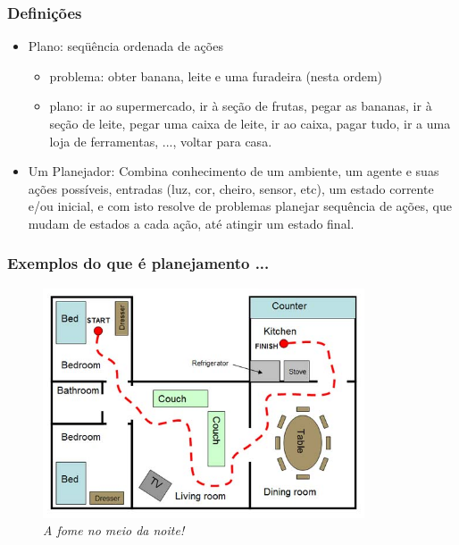 \begin{frame}[fragile]

  \frametitle{Definições}

   \begin{block}{}
     \begin{itemize}
      \item Plano: seqüência ordenada de ações
       \pause
         \begin{itemize}
           \item problema: obter banana, leite e uma furadeira (nesta ordem)

           \pause
            \item plano: ir ao supermercado, ir à seção de frutas, pegar as bananas, 
            ir à seção de leite, pegar uma caixa de leite, ir ao caixa,  pagar tudo, 
            ir a uma loja de ferramentas, ..., voltar para casa.
                                
         \end{itemize}

       \pause
       \item Um Planejador:
        Combina conhecimento de um ambiente, um agente e suas ações possíveis,
        entradas (luz, cor, cheiro, sensor, etc), um estado corrente
        e/ou inicial, e com isto resolve de problemas planejar sequência
        de ações, que mudam de estados a cada ação, até atingir um 
        estado final.
       
    \end{itemize}
    
    \end{block}
    
\end{frame}



\begin{frame}[fragile]
\frametitle{Exemplos do que é planejamento ...}

\begin{figure}[!htb]
\centering
\includegraphics[width=0.85\textwidth, height=0.70\textheight]{figures/planning01.jpg}
\caption{\textit{A fome no meio da noite!}}
\end{figure}


\end{frame}


